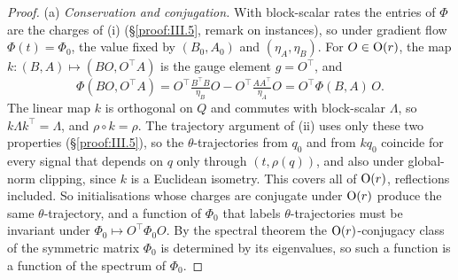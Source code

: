 \begin{proof}
(a) \emph{Conservation and conjugation.} With block-scalar rates the entries of $\Phi$ are the charges of
(i) (\S\ref{proof:III.5}, remark on instances), so under gradient flow $\Phi(t)=\Phi_0$, the value
fixed by $(B_0,A_0)$ and $(\eta_A,\eta_B)$. For $O\in\mathrm{O}(r)$, the map $k:(B,A)\mapsto(BO,O^\top A)$ is the gauge
element $g=O^\top$, and
\[\Phi(BO,O^\top A)=O^\top\tfrac{B^\top B}{\eta_B}O-O^\top\tfrac{AA^\top}{\eta_A}O=O^\top\Phi(B,A)\,O.\]
The linear map $k$ is orthogonal on $Q$ and commutes with block-scalar $\Lambda$, so $k\Lambda k^\top=\Lambda$, and
$\rho\circ k=\rho$. The trajectory argument of (ii) uses only these two properties
(\S\ref{proof:III.5}), so the $\theta$-trajectories from $q_0$ and from $kq_0$ coincide for every signal that depends on
$q$ only through $(t,\rho(q))$, and also under global-norm clipping, since $k$ is a Euclidean isometry. This covers all of
$\mathrm{O}(r)$, reflections included. So initialisations whose charges are conjugate under $\mathrm{O}(r)$ produce the same
$\theta$-trajectory, and a function of $\Phi_0$ that labels $\theta$-trajectories must be invariant under
$\Phi_0\mapsto O^\top\Phi_0O$. By the spectral theorem the $\mathrm{O}(r)$-conjugacy class of the symmetric matrix $\Phi_0$ is
determined by its eigenvalues, so such a function is a function of the spectrum of $\Phi_0$.


\end{proof}
